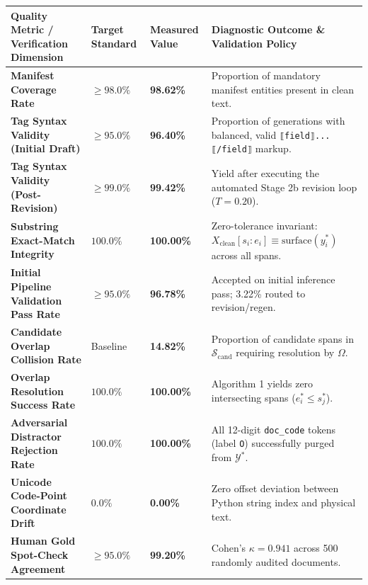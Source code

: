 \documentclass[
]{article}
\newcounter{none} %
\begin{document}
{\def\LTcaptype{none} %
\begin{longtable}[]{@{}
  >{\raggedright\arraybackslash}p{}
  >{\centering\arraybackslash}p{}
  >{\centering\arraybackslash}p{}
  >{\raggedright\arraybackslash}p{}@{}}
\toprule\noalign{}
\begin{minipage}[b]{\linewidth}\raggedright
Quality Metric / Verification Dimension
\end{minipage} & \begin{minipage}[b]{\linewidth}\centering
Target Standard
\end{minipage} & \begin{minipage}[b]{\linewidth}\centering
Measured Value
\end{minipage} & \begin{minipage}[b]{\linewidth}\raggedright
Diagnostic Outcome \& Validation Policy
\end{minipage} \\
\midrule\noalign{}
\endhead
\bottomrule\noalign{}
\endlastfoot
\textbf{Manifest Coverage Rate} & \(\ge 98.0\%\) & \textbf{98.62\%} &
Proportion of mandatory manifest entities present in clean text. \\
\textbf{Tag Syntax Validity (Initial Draft)} & \(\ge 95.0\%\) &
\textbf{96.40\%} & Proportion of generations with balanced, valid
\texttt{⟦field⟧...⟦/field⟧} markup. \\
\textbf{Tag Syntax Validity (Post-Revision)} & \(\ge 99.0\%\) &
\textbf{99.42\%} & Yield after executing the automated Stage 2b revision
loop (\(T=0.20\)). \\
\textbf{Substring Exact-Match Integrity} & \(100.0\%\) &
\textbf{100.00\%} & Zero-tolerance invariant:
\(X_{\text{clean}}[s_i:e_i] \equiv \text{surface}(y_i^*)\) across all
spans. \\
\textbf{Initial Pipeline Validation Pass Rate} & \(\ge 95.0\%\) &
\textbf{96.78\%} & Accepted on initial inference pass; 3.22\% routed to
revision/regen. \\
\textbf{Candidate Overlap Collision Rate} & Baseline & \textbf{14.82\%}
& Proportion of candidate spans in \(\mathcal{S}_{\text{cand}}\)
requiring resolution by \(\Omega\). \\
\textbf{Overlap Resolution Success Rate} & \(100.0\%\) &
\textbf{100.00\%} & Algorithm 1 yields zero intersecting spans
(\(e_i^* \le s_j^*\)). \\
\textbf{Adversarial Distractor Rejection Rate} & \(100.0\%\) &
\textbf{100.00\%} & All 12-digit \texttt{doc\_code} tokens (label
\texttt{O}) successfully purged from \(\mathcal{Y}^*\). \\
\textbf{Unicode Code-Point Coordinate Drift} & \(0.0\%\) &
\textbf{0.00\%} & Zero offset deviation between Python string index and
physical text. \\
\textbf{Human Gold Spot-Check Agreement} & \(\ge 95.0\%\) &
\textbf{99.20\%} & Cohen's \(\kappa = 0.941\) across 500 randomly
audited documents. \\
\end{longtable}
}
\end{document}
